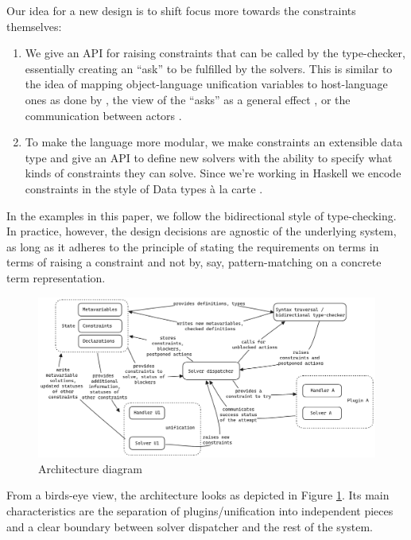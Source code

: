 Our idea for a new design is to shift focus more towards the constraints
themselves:

\begin{enumerate}
\def\labelenumi{\arabic{enumi}.}
\item
  We give an API for raising constraints that can be called by the
  type-checker, essentially creating an ``ask'' to be fulfilled by the
  solvers. This is similar to the idea of mapping object-language
  unification variables to host-language ones as done by
  \citet{guidiImplementingTypeTheory2017}, the view of the ``asks'' as a
  general effect \citep[chap.~4.4]{bauerEqualityCheckingGeneral2020}, or
  the communication between actors
  \citep{allaisTypOSOperatingSystem2022a}.
\item
  To make the language more modular, we make constraints an extensible
  data type and give an API to define new solvers with the ability to
  specify what kinds of constraints they can solve. Since we're working
  in Haskell we encode constraints in the style of Data types à la carte
  \citep{swierstraDataTypesCarte2008}.
\end{enumerate}

In the examples in this paper, we follow the bidirectional style of
type-checking. In practice, however, the design decisions are agnostic
of the underlying system, as long as it adheres to the principle of
stating the requirements on terms in terms of raising a constraint and
not by, say, pattern-matching on a concrete term representation.

\begin{figure}
  \center
  \includegraphics[width=\textwidth]{architecture-diagram}
  \caption{Architecture diagram}
  \label{architecture-figure}
\end{figure}

From a birds-eye view, the architecture looks as depicted in Figure
\ref{architecture-figure}. Its main characteristics are the separation
of plugins/unification into independent pieces and a clear boundary
between solver dispatcher and the rest of the system.

